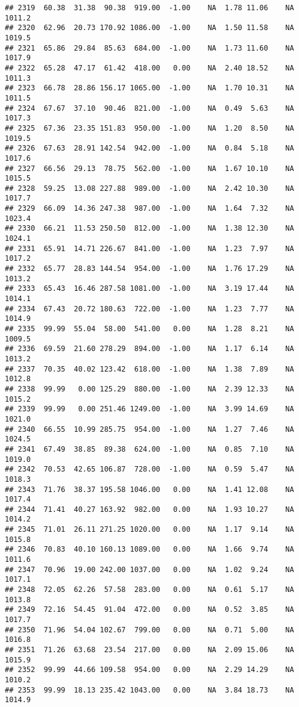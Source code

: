 \documentclass{article}\usepackage{graphicx, color}
\makeatletter
\newenvironment{kframe}{%
 \def\at@end@of@kframe{}%
 \ifinner\ifhmode%
  \def\at@end@of@kframe{\end{minipage}}%
  \begin{minipage}{\columnwidth}%
 \fi\fi%
 \def\FrameCommand##1{\hskip\@totalleftmargin \hskip-\fboxsep
 \colorbox{shadecolor}{##1}\hskip-\fboxsep
     \hskip-\linewidth \hskip-\@totalleftmargin \hskip\columnwidth}%
 \MakeFramed {\advance\hsize-\width
   \@totalleftmargin\z@ \linewidth\hsize
   \@setminipage}}%
 {\par\unskip\endMakeFramed%
 \at@end@of@kframe}
\newenvironment{knitrout}{}{} %
\makeatother
\begin{document}
\begin{knitrout}
\begin{kframe}
\begin{verbatim}
## 2319  60.38  31.38  90.38  919.00  -1.00    NA  1.78 11.06    NA 1011.2
## 2320  62.96  20.73 170.92 1086.00  -1.00    NA  1.50 11.58    NA 1019.5
## 2321  65.86  29.84  85.63  684.00  -1.00    NA  1.73 11.60    NA 1017.9
## 2322  65.28  47.17  61.42  418.00   0.00    NA  2.40 18.52    NA 1011.3
## 2323  66.78  28.86 156.17 1065.00  -1.00    NA  1.70 10.31    NA 1011.5
## 2324  67.67  37.10  90.46  821.00  -1.00    NA  0.49  5.63    NA 1017.3
## 2325  67.36  23.35 151.83  950.00  -1.00    NA  1.20  8.50    NA 1019.5
## 2326  67.63  28.91 142.54  942.00  -1.00    NA  0.84  5.18    NA 1017.6
## 2327  66.56  29.13  78.75  562.00  -1.00    NA  1.67 10.10    NA 1015.5
## 2328  59.25  13.08 227.88  989.00  -1.00    NA  2.42 10.30    NA 1017.7
## 2329  66.09  14.36 247.38  987.00  -1.00    NA  1.64  7.32    NA 1023.4
## 2330  66.21  11.53 250.50  812.00  -1.00    NA  1.38 12.30    NA 1024.1
## 2331  65.91  14.71 226.67  841.00  -1.00    NA  1.23  7.97    NA 1017.2
## 2332  65.77  28.83 144.54  954.00  -1.00    NA  1.76 17.29    NA 1013.2
## 2333  65.43  16.46 287.58 1081.00  -1.00    NA  3.19 17.44    NA 1014.1
## 2334  67.43  20.72 180.63  722.00  -1.00    NA  1.23  7.77    NA 1014.9
## 2335  99.99  55.04  58.00  541.00   0.00    NA  1.28  8.21    NA 1009.5
## 2336  69.59  21.60 278.29  894.00  -1.00    NA  1.17  6.14    NA 1013.2
## 2337  70.35  40.02 123.42  618.00  -1.00    NA  1.38  7.89    NA 1012.8
## 2338  99.99   0.00 125.29  880.00  -1.00    NA  2.39 12.33    NA 1015.2
## 2339  99.99   0.00 251.46 1249.00  -1.00    NA  3.99 14.69    NA 1021.0
## 2340  66.55  10.99 285.75  954.00  -1.00    NA  1.27  7.46    NA 1024.5
## 2341  67.49  38.85  89.38  624.00  -1.00    NA  0.85  7.10    NA 1019.0
## 2342  70.53  42.65 106.87  728.00  -1.00    NA  0.59  5.47    NA 1018.3
## 2343  71.76  38.37 195.58 1046.00   0.00    NA  1.41 12.08    NA 1017.4
## 2344  71.41  40.27 163.92  982.00   0.00    NA  1.93 10.27    NA 1014.2
## 2345  71.01  26.11 271.25 1020.00   0.00    NA  1.17  9.14    NA 1015.8
## 2346  70.83  40.10 160.13 1089.00   0.00    NA  1.66  9.74    NA 1011.6
## 2347  70.96  19.00 242.00 1037.00   0.00    NA  1.02  9.24    NA 1017.1
## 2348  72.05  62.26  57.58  283.00   0.00    NA  0.61  5.17    NA 1013.8
## 2349  72.16  54.45  91.04  472.00   0.00    NA  0.52  3.85    NA 1017.7
## 2350  71.96  54.04 102.67  799.00   0.00    NA  0.71  5.00    NA 1016.8
## 2351  71.26  63.68  23.54  217.00   0.00    NA  2.09 15.06    NA 1015.9
## 2352  99.99  44.66 109.58  954.00   0.00    NA  2.29 14.29    NA 1010.2
## 2353  99.99  18.13 235.42 1043.00   0.00    NA  3.84 18.73    NA 1014.9

\end{verbatim}
\end{kframe}
\end{knitrout}
\end{document}
